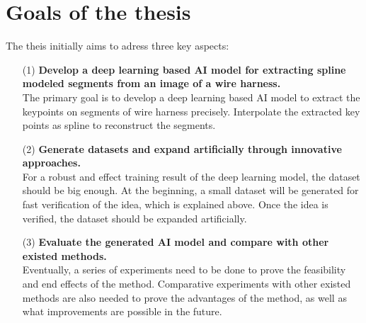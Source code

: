 \section{Goals of the thesis}
    The theis initially aims to adress three key aspects:
\begin{itemize}
    \item [(1)] \textbf{Develop a deep learning based AI model for extracting spline modeled segments from an image of a wire harness.}\\ 
    The primary goal is to develop a deep learning based AI model to extract the keypoints on segments of wire harness precisely.
    Interpolate the extracted key points as spline to reconstruct the segments. 
    \item [(2)] \textbf{Generate datasets and expand artificially through innovative approaches.}\\ 
    For a robust and effect training result of the deep learning model, the dataset should be big enough. At the beginning, a small dataset will be 
    generated for fast verification of the idea, which is explained above. Once the idea is verified, the dataset should be expanded artificially.
    \item [(3)] \textbf{Evaluate the generated AI model and compare with other existed methods.} \\ 
    Eventually, a series of experiments need to be done to prove the feasibility and end effects of the method. Comparative experiments with other existed methods  
    are also needed to prove the advantages of the method, as well as what improvements are possible in the future.
\end{itemize}
